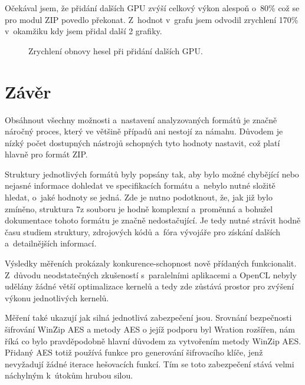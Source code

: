 Očekával jsem, že přidání dalších GPU zvýší celkový výkon alespoň o~80\% což se pro modul ZIP
povedlo překonat. Z~hodnot v~grafu jsem odvodil zrychlení 170\% v~okamžiku kdy jsem přidal další
2 grafiky.

\begin{figure}[ht]
    \begin{center}
	\caption{Zrychlení obnovy hesel při přidání dalších GPU.}
	\label{memory}
    \end{center}
\end{figure}

\chapter{Závěr}
Obsáhnout všechny možnosti a~nastavení analyzovaných formátů je značně náročný proces, který
ve většině případů ani nestojí za námahu. Důvodem je nízký počet dostupných nástrojů schopných
tyto hodnoty nastavit, což platí hlavně pro formát ZIP.

 Struktury jednotlivých formátů byly popsány tak, aby bylo možné chybějící nebo nejasné informace
dohledat ve specifikacích formátu a~nebylo nutné složitě hledat, o~jaké hodnoty se jedná. Zde
je nutno podotknout, že, jak již bylo zmíněno, struktura 7z souboru je hodně komplexní a~proměnná a
bohužel dokumentace tohoto formátu je značně nedostačující. Je tedy nutné strávit hodně času
studiem struktury, zdrojových kódů a~fóra vývojáře pro získání dalších a~detailnějších informací.

 Výsledky měřeních prokázaly konkurence-schopnost nově přídaných funkcionalit. Z~důvodu
neodstatečných zkušeností s~paralelními aplikacemi a OpenCL nebyly udělány žádné větší
optimalizace kernelů a tedy zde zůstává prostor pro zvýšení výkonu jednotlivých kernelů. 

 Měření také ukazují jak silná jednotlivá zabezpečení jsou. Srovnání bezpečnosti šifrování
WinZip AES a metody AES o jejíž podporu byl Wration rozšířen, nám říká co bylo pravděpodobně hlavní
důvodem za vytvořením metody WinZip AES. Přidaný AES totiž používá funkce pro generování
šifrovacího klíče, jenž nevyžadují žádné iterace hešovacích funkcí. Tím se toto zabezpečení stává
velmi náchylným k~útokům hrubou silou.

